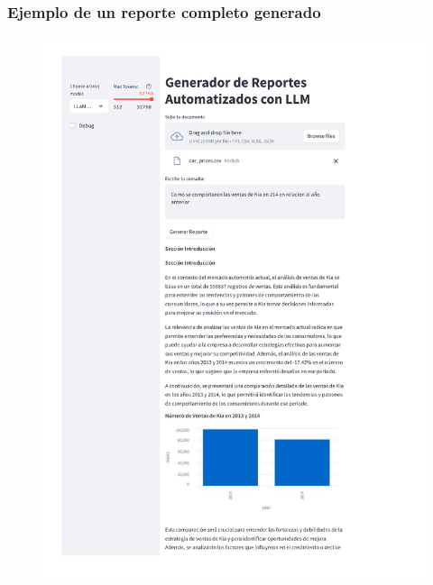 \begin{anexos}
	\subsubsection{Ejemplo de un reporte completo generado}
	\begin{figure}[H]
		\centering
		\includegraphics[height=\textheight]{reporte/1.png}
	\end{figure}
	\begin{figure}
		\centering

\end{figure}
\end{anexos}
